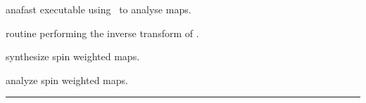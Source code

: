 \begin{related}
  \begin{sulist}{} %
  \item[anafast] executable using \thedocid \ to analyse maps.
  \item[\htmlref{alm2map}{sub:alm2map}] routine performing the inverse transform of \thedocid.
  \item[\htmlref{alm2map\_spin}{sub:alm2map_spin}] synthesize spin weighted maps.
  \item[\htmlref{map2alm\_spin}{sub:map2alm_spin}] analyze spin weighted maps.
  \end{sulist}
\end{related}

\rule{\hsize}{2mm}

\newpage
